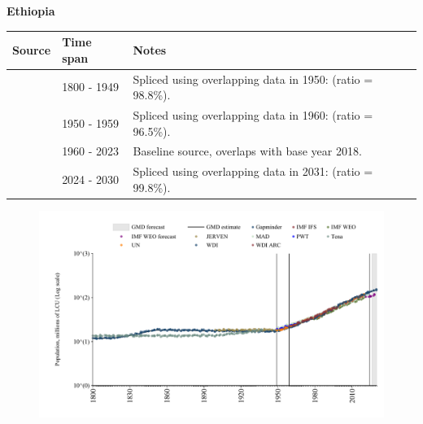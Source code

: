 \documentclass[12pt,a4paper,landscape]{article}
\begin{document}
\begin{adjustbox}{max totalsize={\paperwidth}{\paperheight},center}
\begin{minipage}[t][\textheight][t]{\textwidth}
\vspace*{0.5cm}
{}
\begin{center}
{\Large\bfseries Ethiopia}
\end{center}
\vspace{0.5cm}
\begin{table}[H]
\centering
\small
\begin{tabular}{|l|l|l|}
\hline
\textbf{Source} & \textbf{Time span} & \textbf{Notes} \\
\hline
\rowcolor{white}\cite{Gapminder}& 1800 - 1949 &Spliced using overlapping data in 1950: (ratio = 98.8\%).\\
\rowcolor{lightgray}\cite{IMF_IFS}& 1950 - 1959 &Spliced using overlapping data in 1960: (ratio = 96.5\%).\\
\rowcolor{white}\cite{WDI}& 1960 - 2023 &Baseline source, overlaps with base year 2018.\\
\rowcolor{lightgray}\cite{Gapminder}& 2024 - 2030 &Spliced using overlapping data in 2031: (ratio = 99.8\%).\\
\hline
\end{tabular}
\end{table}
\begin{figure}[H]
\centering
\includegraphics[width=\textwidth,height=0.6\textheight,keepaspectratio]{graphs/ETH_pop.pdf}
\end{figure}
\end{minipage}
\end{adjustbox}
\end{document}
